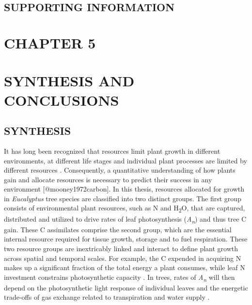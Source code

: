 \documentclass[a4paper]{article}\usepackage[]{graphicx}\usepackage[]{color}
\begin{document}
\subsection*{SUPPORTING INFORMATION}

\setcounter{page}{1}     
\clearpage
\section*{CHAPTER 5 \\ \mbox{ }\\ SYNTHESIS AND CONCLUSIONS}
\subsection*{SYNTHESIS}
It has long been recognized that resources limit plant growth in different environments, at different life stages and individual plant processes are limited by different resources \citep{bazzaz2000reproductive}. Consequently, a quantitative understanding of how plants gain and allocate resources is necessary to predict their success in any environment [@mooney1972carbon]. In this thesis, resources allocated for growth in \textit{Eucalyptus} tree species are classified into two distinct groups. The first group consists of environmental plant resources, such as N and H\textsubscript{2}O, that are captured, distributed and utilized to drive rates of leaf photosynthesis (\textit{A\textsubscript{n}}) and thus tree C gain. These C assimilates comprise the second group, which are the essential internal resource required for tissue growth, storage and to fuel respiration. These two resource groups are inextricably linked and interact to define plant growth across spatial and temporal scales. For example, the C expended in acquiring N makes up a significant fraction of the total energy a plant consumes, while leaf N investment constrains photosynthetic capacity \citep{chapin1987plant}. In trees, rates of \textit{A\textsubscript{n}} will then depend on the photosynthetic light response of individual leaves and the energetic trade-offs of gas exchange related to transpiration and water supply \citep{givnish1988adaptation}.
\end{document}
